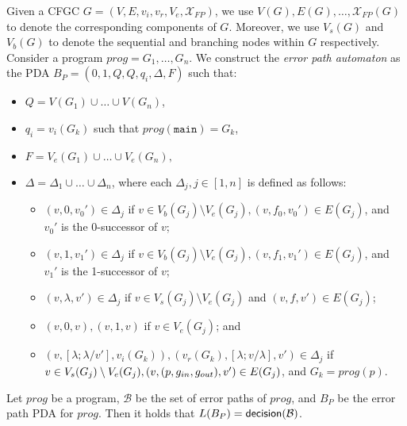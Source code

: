 Given a CFGC $G = (V, E, v_i, v_r, V_e, \mathcal{X}_{FP})$, we use $V(G), E(G), \dots, \mathcal{X}_{FP}(G)$ to denote the corresponding components of $G$. Moreover, we use $V_s(G)$ and $V_b(G)$ to denote the sequential and branching nodes within $G$ respectively. Consider a program $prog = {G_1, \dots, G_n}$. We construct the \emph{error path automaton} as the PDA $B_P = ({0,1}, Q, Q, q_i, \Delta, F)$ such that: 
\begin{itemize}
	\item $Q = V(G_1) \cup \dots \cup V(G_n)$,
	\item $q_i = v_i(G_k)$ such that $prog(\mathtt{main}) = G_k$,
	\item $F = V_e(G_1) \cup \dots \cup V_e(G_n),$
	\item $\Delta = \Delta_1 \cup \dots \cup \Delta_n$, where each $\Delta_j , j \in [1,n]$ is defined as follows:
	\begin{itemize}
		\item $(v, 0, v_0') \in \Delta_j$ if $ v \in V_b(G_j) \setminus V_e(G_j), (v, f_0, v_0') \in E(G_j)$, and $v_0'$ is the 0-successor of $v$;
		\item $(v, 1, v_1') \in \Delta_j$ if $ v \in V_b(G_j) \setminus V_e(G_j), (v, f_1, v_1') \in E(G_j)$, and $v_1'$ is the 1-successor of $v$;
		\item $(v, \lambda, v') \in \Delta_j$ if $v \in V_s(G_j) \setminus V_e(G_j)$ and $(v, f, v') \in E(G_j)$;
		\item $(v, 0, v) , (v, 1, v) $ if $ v \in V_e(G_j)$; and
		\item $(v, [\lambda;\lambda/v'], v_i(G_k)), (v_r(G_k), [\lambda;v/\lambda], v') \in \Delta_j$ if $v \in V_s(G_j) \setminus V_e(G_j), \\ (v, (p, g_{in}, g_{out}), v') \in E(G_j)$, and $G_k = prog(p)$.
	\end{itemize}
\end{itemize}

\begin{lemma}
	Let $prog$ be a program, $\mathcal{B}$ be the set of error paths of $prog$, and $B_P$ be the error path PDA for $prog$. Then it holds that $L(B_P) = \mathsf{decision}(\mathcal{B})$.
\end{lemma}